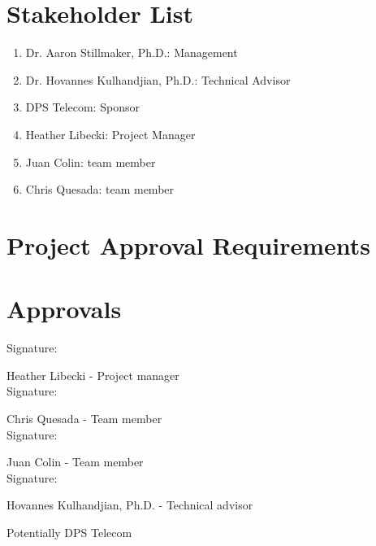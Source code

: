  
 \section{Stakeholder List}
 \begin{enumerate}
 	\item	Dr. Aaron Stillmaker, Ph.D.: Management\\ 
 	\item   Dr. Hovannes Kulhandjian, Ph.D.: Technical Advisor\\
 	\item	DPS Telecom: Sponsor\\
 	\item	Heather Libecki: Project Manager\\
	\item 	Juan Colin: team member\\
 	\item	Chris Quesada: team member\\
 	 	
 \end{enumerate}
 
 \section{Project Approval Requirements}
 
 \pagebreak

\section{Approvals}
\setlength{\parindent}{15ex}
	\begin{flushleft}
	Signature: \hrulefill
	
	\hspace*{0mm}\phantom{Approved: }Heather Libecki - Project manager\\
	\vspace{12pt}
	Signature: \hrulefill
	
	\hspace*{0mm}\phantom{Approved: }Chris Quesada - Team member\\
	\vspace{12pt}
	Signature: \hrulefill
	
	\hspace*{0mm}\phantom{Approved: }Juan Colin - Team member\\
	\vspace{12pt}
	Signature: \hrulefill
	
	\hspace*{0mm}\phantom{Approved: }Hovannes Kulhandjian, Ph.D. -
	 Technical advisor\\
	 \vspace{12pt}
	
	Potentially DPS Telecom
\end{flushleft}\par
\newpage
\cite{de1}
\cite{SM}
\cite{SMD}


	
		
 

